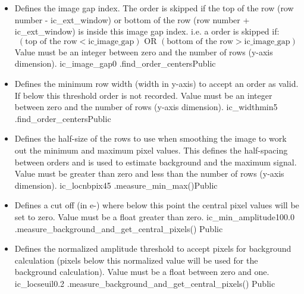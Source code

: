 \begin{itemize}
\item {}
{Defines the image gap index. The order is skipped if the top of the row (row number - ic\_ext\_window) or bottom of the row (row number + ic\_ext\_window) is inside this image gap index. i.e. a order is skipped if:
\begin{equation}
(\text{top of the row} < \text{ic\_image\_gap})
\text{ OR } 
(\text{bottom of the row} > \text{ic\_image\_gap})
\end{equation}
Value must be an integer between zero and the number of rows (y-axis dimension).
}
{ic\_image\_gap}{0}
{\callocRAW}{\constantsfile}
{\spirouLOCOR.find\_order\_centers}{Public}


\item {}
{Defines the minimum row width (width in y-axis) to accept an order as valid. If below this threshold order is not recorded. Value must be an integer between zero and the number of rows (y-axis dimension).}
{ic\_widthmin}{5}
{\callocRAW}{\constantsfile}
{\spirouLOCOR.find\_order\_centers}{Public}

\item {}
{Defines the half-size of the rows to use when smoothing the image to work out the minimum and maximum pixel values. This defines the half-spacing between orders and is used to estimate background and the maximum signal. Value must be greater than zero and less than the number of rows (y-axis dimension).}
{ic\_locnbpix}{45}
{\callocRAW}{\constantsfile}
{\spirouBACK.measure\_min\_max()}{Public}

\item {}
{Defines a cut off (in e-) where below this point the central pixel values will be set to zero. Value must be a float greater than zero.}
{ic\_min\_amplitude}{100.0}
{\callocRAW}{\constantsfile}{\spirouBACK.measure\_background\_{\hskip 0pt}and\_get\_central\_pixels()}
{Public}

\item {}
{Defines the normalized amplitude threshold to accept pixels for background calculation (pixels below this normalized value will be used for the background calculation). Value must be a float between zero and one.}
{ic\_locseuil}{0.2}
{\callocRAW}{\constantsfile}{\spirouBACK.measure\_background\_{\hskip 0pt}and\_get\_central\_pixels()}
{Public}


\end{itemize}
